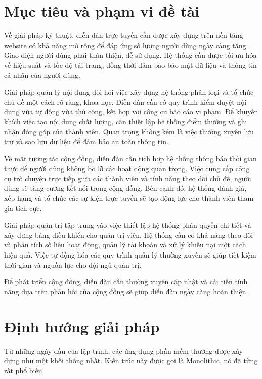 \documentclass[../index.tex]{subfiles}
\begin{document}
    \section{Mục tiêu và phạm vi đề tài}
    Về giải pháp kỹ thuật, diễn đàn trực tuyến cần được xây dựng trên nền tảng
    website có khả năng mở rộng để đáp ứng số lượng người dùng ngày càng tăng. Giao
    diện người dùng phải thân thiện, dễ sử dụng. Hệ thống cần được tối ưu hóa về
    hiệu suất và tốc độ tải trang, đồng thời đảm bảo bảo mật dữ liệu và thông
    tin cá nhân của người dùng.

    Giải pháp quản lý nội dung đòi hỏi việc xây dựng hệ thống phân loại và tổ
    chức chủ đề một cách rõ ràng, khoa học. Diễn đàn cần có quy trình kiểm duyệt
    nội dung vừa tự động vừa thủ công, kết hợp với công cụ báo cáo vi phạm. Để
    khuyến khích việc tạo nội dung chất lượng, cần thiết lập hệ thống điểm thưởng
    và ghi nhận đóng góp của thành viên. Quan trọng không kém là việc thường
    xuyên lưu trữ và sao lưu dữ liệu để đảm bảo an toàn thông tin.

    Về mặt tương tác cộng đồng, diễn đàn cần tích hợp hệ thống thông báo thời gian
    thực để người dùng không bỏ lỡ các hoạt động quan trọng. Việc cung cấp công
    cụ trò chuyện trực tiếp giữa các thành viên và tính năng theo dõi chủ đề, người
    dùng sẽ tăng cường kết nối trong cộng đồng. Bên cạnh đó, hệ thống đánh giá,
    xếp hạng và tổ chức các sự kiện trực tuyến sẽ tạo động lực cho thành viên
    tham gia tích cực.

    Giải pháp quản trị tập trung vào việc thiết lập hệ thống phân quyền chi tiết
    và xây dựng bảng điều khiển cho quản trị viên. Hệ thống cần có khả năng theo
    dõi và phân tích số liệu hoạt động, quản lý tài khoản và xử lý khiếu nại một
    cách hiệu quả. Việc tự động hóa các quy trình quản lý thường xuyên sẽ giúp tiết
    kiệm thời gian và nguồn lực cho đội ngũ quản trị.

    Để phát triển cộng đồng, diễn đàn cần thường xuyên cập nhật và cải tiến tính
    năng dựa trên phản hồi của cộng đồng sẽ giúp diễn đàn ngày càng hoàn thiện.

    \section{Định hướng giải pháp}
    Từ những ngày đầu của lập trình, các ứng dụng phần mềm thường được xây dựng như
    một khối thống nhất. Kiến trúc này được gọi là Monolithic, nó đã từng rất phổ
    biến.
\end{document}

